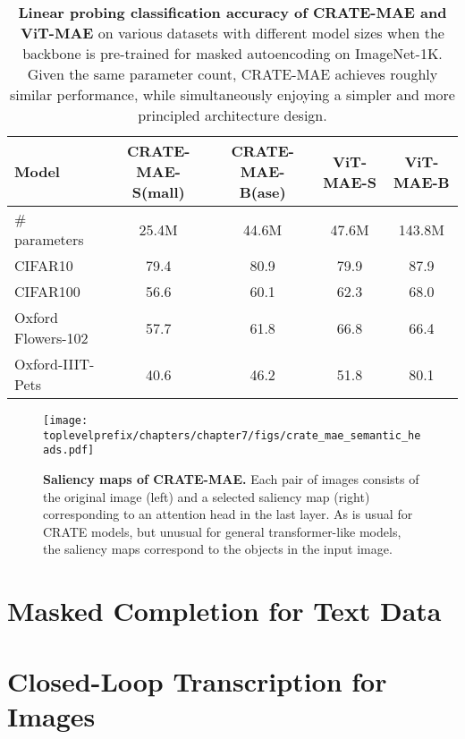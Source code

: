 \documentclass[\toplevelprefix/book-main.tex]{subfiles}
\begin{document}
\begin{table}
    \centering 
    \begin{tabular}{@{}lcc|cc@{}}
        \toprule 
        \textbf{Model} & CRATE-MAE-S(mall) & CRATE-MAE-B(ase) & {\color{gray} ViT-MAE-S} & {\color{gray} ViT-MAE-B} \\
        \midrule
        \midrule
        \# parameters & 25.4M & 44.6M & 47.6M & {\color{gray}143.8M} \\
        \midrule
        CIFAR10 & 79.4 & 80.9 & {\color{gray} 79.9} & {\color{gray} 87.9} \\
        CIFAR100 & 56.6 & 60.1 & {\color{gray} 62.3} & {\color{gray} 68.0} \\
        Oxford Flowers-102 & 57.7 & 61.8 & {\color{gray} 66.8} & {\color{gray} 66.4} \\
        Oxford-IIIT-Pets & 40.6 & 46.2 & {\color{gray} 51.8} & {\color{gray} 80.1} \\
        \bottomrule
    \end{tabular}
    \caption{\small\textbf{Linear probing classification accuracy of CRATE-MAE and ViT-MAE} on various datasets with different model sizes when the backbone is pre-trained for masked autoencoding on ImageNet-1K. Given the same parameter count, CRATE-MAE achieves roughly similar performance, while simultaneously enjoying a simpler and more principled architecture design.}
    \label{tab:crate_mae_linear_probing}
\end{table}

\begin{figure}
    \centering 
    \texttt{[image: \\toplevelprefix/chapters/chapter7/figs/crate\_mae\_semantic\_heads.pdf]}
    \caption{\small\textbf{Saliency maps of CRATE-MAE.} Each pair of images consists of the original image (left) and a selected saliency map (right) corresponding to an attention head in the last layer. As is usual for CRATE models, but unusual for general transformer-like models, the saliency maps correspond to the objects in the input image.}
    \label{fig:crate_mae_semantic_heads}
\end{figure}

\section{Masked Completion for Text Data}\label{sec:text_completion}

\section{Closed-Loop Transcription for Images}\label{sec:ctrl}
\end{document}
